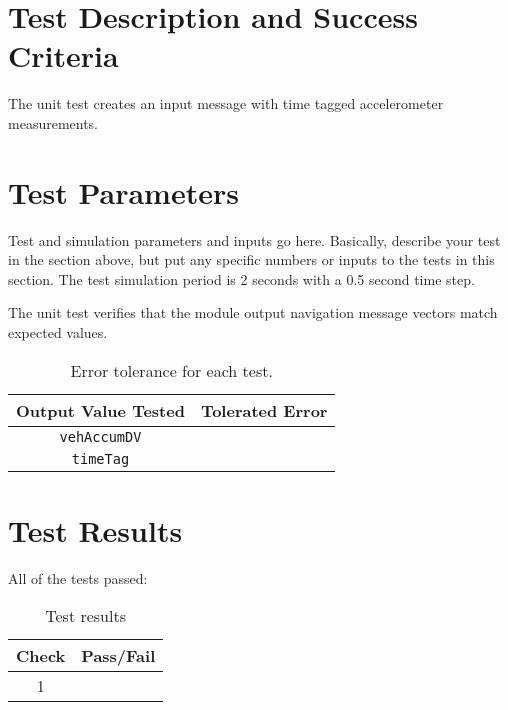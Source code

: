 
\section{Test Description and Success Criteria}
The unit test creates an input message with time tagged accelerometer measurements.  




\section{Test Parameters}

Test and simulation parameters and inputs go here. Basically, describe your test in the section above, but put any specific numbers or inputs to the tests in this section.  The test simulation period is 2 seconds with a 0.5 second time step.  

The unit test verifies that the module output navigation message vectors match expected values.
\begin{table}[htbp]
	\caption{Error tolerance for each test.}
	\label{tab:errortol}
	\centering \fontsize{10}{10}\selectfont
	\begin{tabular}{ c | c } %
		\hline\hline
		\textbf{Output Value Tested}  & \textbf{Tolerated Error}  \\ 
		\hline
		{\tt vehAccumDV}        & 	   \\ 
		{\tt timeTag}        & 	   \\ 
		\hline\hline
	\end{tabular}
\end{table}




\section{Test Results}
All of the tests passed:
\begin{table}[H]
	\caption{Test results}
	\label{tab:results}
	\centering \fontsize{10}{10}\selectfont
	\begin{tabular}{c | c  } %
		\hline\hline
		\textbf{Check} &\textbf{Pass/Fail} \\ 
		\hline
	   1	   			&  \\ 
	   \hline\hline
	\end{tabular}
\end{table}



